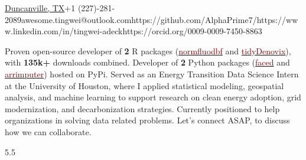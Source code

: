 \documentclass[9pt]{adeckcv} %
\begin{document}
  
{\href{https://www.google.com/maps/search/?api=1\&query=32.7766642,-96.7969879}{Duncanville, TX}}{+1 (227)-281-2089}{awesome.tingwei@outlook.com}{https://github.com/AlphaPrime7/}{https://www.linkedin.com/in/tingwei-adeck}{https://orcid.org/0009-0009-7450-8863}

  

\begin{minipage}[t]{0.4\textwidth}
\vspace{-\baselineskip} 

{Proven open-source developer of \textbf{2} R packages (\href{https://alphaprime7.github.io/normfluodbf/}{\textcolor{maroon}{normfluodbf}} and \href{https://alphaprime7.github.io/tidyDenovix/}{\textcolor{maroon}{tidyDenovix}}), with \textbf{135k+} downloads combined. Developer of \textbf{2} Python packages (\href{https://pypi.org/project/faced/}{\textcolor{maroon}{faced}} and \href{https://pypi.org/project/arrimputer/1.3.0/}{\textcolor{maroon}{arrimputer}}) hosted on PyPi.} 
{Served as an Energy Transition Data Science Intern at the University of Houston, where I applied statistical modeling, geospatial analysis, and machine learning to support research on clean energy adoption, grid modernization, and decarbonization strategies.}
{Currently positioned to help organizations in solving data related problems. Let’s connect ASAP, to discuss how we can collaborate.}


\end{minipage}
\hfill %
\begin{minipage}[t]{0.5\textwidth} %
	\vspace{-\baselineskip} %
	\begin{barchart}{5.5}
	\end{barchart}
\end{minipage}
\end{document}
